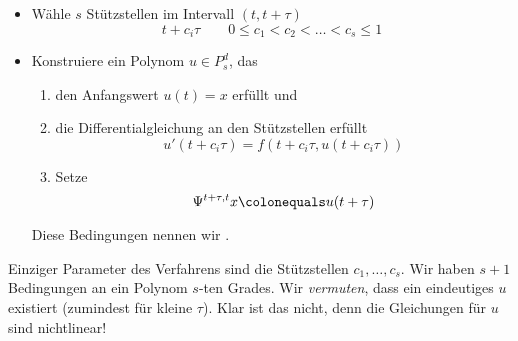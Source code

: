 \begin{idea}
	\begin{itemize}
		\item Wähle $s$ Stützstellen im Intervall $(t, t+ \tau)$
		\begin{equation*}
			t + c_i \tau \qquad 0 \le c_1 < c_2 < \dots < c_s \le 1 
		\end{equation*}
		\item Konstruiere ein Polynom $u \in P_s^d$, das 
		\begin{enumerate}
			\item \label{enum:colloq_AW} den Anfangswert $u(t) = x$ erfüllt und
			\item \label{enum:colloq_DGL} die Differentialgleichung an den Stützstellen erfüllt
			\begin{equation*}
				u'(t + c_i \tau) = f(t + c_i \tau, u(t+c_i \tau)) \tag{$i=1,\dots, s$}
			\end{equation*}
			\item \label{enum:colloq_Disc} Setze
			\begin{equation*}
				\Psi^{t+\tau,t} x \colonequals u(t+\tau)
			\end{equation*} 
		\end{enumerate}
		Diese Bedingungen nennen wir .
	\end{itemize}
\end{idea}

Einziger Parameter des Verfahrens sind die Stützstellen $c_1, \dots, c_s$. Wir haben $s+1$ Bedingungen an ein Polynom $s$-ten Grades. Wir \textit{vermuten}, dass ein eindeutiges $u$ existiert (zumindest für kleine $\tau$). Klar ist das nicht, denn die Gleichungen für $u$ sind nichtlinear!

